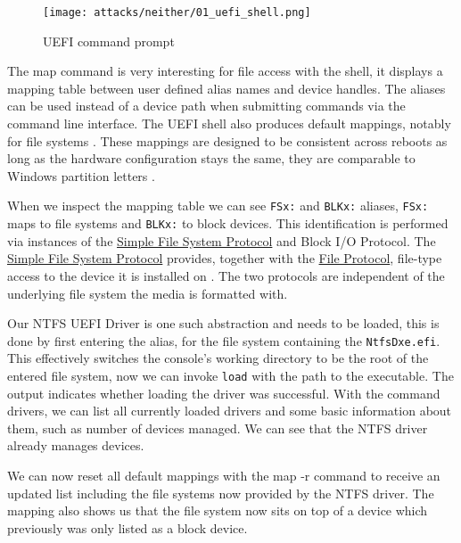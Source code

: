 \begin{figure}[htb]
    \centering
    \texttt{[image: attacks/neither/01\_uefi\_shell.png]}
    \caption{\ac{UEFI} command prompt}
    \label{fig:uefi-shell}
\end{figure}


The map command is very interesting for file access with the shell, it displays a mapping table between user defined alias names and device handles.
The aliases can be used instead of a device path when submitting commands via the command line interface.
The \ac{UEFI} shell also produces default mappings, notably for file systems \cite[3.7.2. Mappings]{uefi-shell-spec}.
These mappings are designed to be consistent across reboots as long as the hardware configuration stays the same, they are comparable to Windows partition letters \cite[Appendix A]{uefi-shell-spec}.

When we inspect the mapping table we can see \lstinline{FSx:} and \lstinline{BLKx:} aliases, \lstinline{FSx:} maps to file systems and \lstinline{BLKx:} to block devices.
This identification is performed via instances of the \hyperref[lst:simple-file-system-protocol]{Simple File System Protocol} and  Block \ac{I/O} Protocol.
The \hyperref[lst:simple-file-system-protocol]{Simple File System Protocol} \cite[Section 13.4]{uefi-spec} provides, together with the \hyperref[lst:simple-file-system-protocol]{File Protocol}, file-type access to the device it is installed on \cite[Section 13.5]{uefi-spec}.
The two protocols are independent of the underlying file system the media is formatted with.


Our \ac{NTFS} \ac{UEFI} Driver is one such abstraction and needs to be loaded, this is done by first entering the alias, for the file system containing the \lstinline{NtfsDxe.efi}.
This effectively switches the console's working directory to be the root of the entered file system, now we can invoke \lstinline{load} with the path to the executable.
The output indicates whether loading the driver was successful.
With the command drivers, we can list all currently loaded drivers and some basic information about them, such as number of devices managed.
We can see that the NTFS driver already manages devices.

We can now reset all default mappings with the map -r command to receive an updated list including the file systems now provided by the \ac{NTFS} driver.
The mapping also shows us that the file system now sits on top of a device which previously was only listed as a block device.

